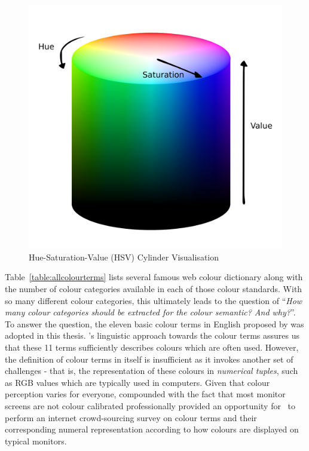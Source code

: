 \begin{figure}[hbt!]\centering
\includegraphics[width=.5\textwidth]{image/general/HSV.png}
\caption{Hue-Saturation-Value (HSV) Cylinder Visualisation}
\label{fig:hsvcylinder}
\end{figure}

Table~\ref{table:allcolourterms} lists several famous web colour dictionary along with the number of colour categories available in each of those colour standards. With so many different colour categories, this ultimately leads to the question of ``\textit{How many colour categories should be extracted for the colour semantic? And why?}''.
To answer the question, the eleven basic colour terms in English proposed by \cite{berlinandkay} was adopted in this thesis.
's linguistic approach towards the colour terms assures us that these 11 terms sufficiently describes colours which are often used.
However, the definition of colour terms in itself is insufficient as it invokes another set of challenges - that is, the representation of these colours in \textit{numerical tuples}, such as RGB values which are typically used in computers.
Given that colour perception varies for everyone, compounded with the fact that most monitor screens are not colour calibrated professionally provided an opportunity for~ to perform an internet crowd-sourcing survey on colour terms and their corresponding numeral representation according to how colours are displayed on typical monitors.

